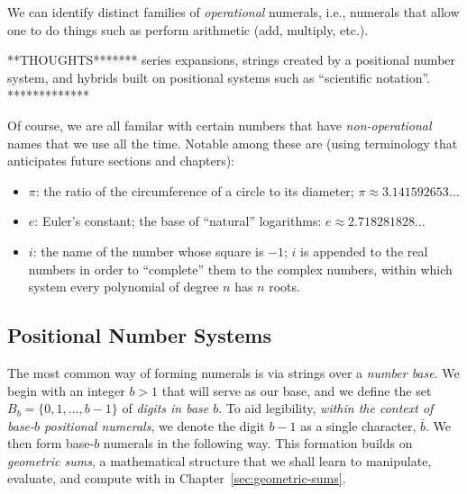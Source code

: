 We can identify distinct families of {\em operational}
numerals, i.e., numerals that allow one to
do things such as perform arithmetic (add, multiply, etc.).

**THOUGHTS*******
series expansions, strings created by a positional number system, and
hybrids built on positional systems such as ``scientific notation''.
*************


Of course, we are all familar with certain numbers that have {\em
  non-operational} names that we use all the time.  Notable among
these are (using terminology that anticipates future sections and
chapters):
\begin{itemize}
\item
$\pi$: the ratio of the circumference of a circle to its diameter;
  $\pi \approx 3.141592653 \ldots$
\item
$e$: Euler's constant; the base of ``natural'' logarithms: $e \approx
  2.718281828 \ldots$
\item
$i$: the name of the number whose square is $-1$; $i$ is appended to
  the real numbers in order to ``complete'' them to the complex
  numbers, within which system every polynomial of degree $n$ has $n$
  roots.
\end{itemize}


\subsection{Positional Number Systems}
\label{sec:positional-numbers}

The most common way of forming numerals is via strings over a {\it
  number base}.  
%
We begin with an integer $b>1$ that will serve as our base, and we
define the set $B_b = \{ 0, 1, \ldots, b-1\}$ of {\it digits in base
  $b$}.
%
To aid legibility, {\em within the context of base-$b$ positional
  numerals}, we denote the digit $b-1$ as a single character,
$\bar{b}$.
%
We then form base-$b$ numerals in the following way.
%
This formation builds on {\em geometric sums}, a mathematical
structure that we shall learn to manipulate, evaluate, and compute
with in Chapter~\ref{sec:geometric-sums}.

